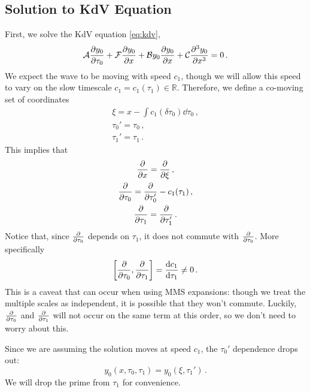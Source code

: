 \documentclass{jfm}
\let\Oldsubsection\subsection
\renewcommand{\subsection}{\FloatBarrier\Oldsubsection}
\begin{document}
\subsection{\label{sec:kdv_solution} Solution to KdV Equation}
First, we solve the KdV equation \cref{eq:kdv},
\begin{equation}
  \mathcal{A} \pdv{y_0}{\tau_0} + \mathcal{F} \pdv{y_0}{x} + \mathcal{B}
  y_0 \pdv{y_0}{x} + \mathcal{C} \pdv[3]{y_0}{x} = 0  \,.
\end{equation}
We expect the wave to be moving with speed $c_1$, though we will allow
this speed to vary on the slow timescale $c_1 = c_1(\tau_1) \in
\mathbb{R}$.
Therefore, we define a co-moving set of coordinates
\begin{gather}
  \xi = x - \int c_1(\delta \tau_0) \dd{\tau_0} \,, \\
  \tau_0' = \tau_0 \,, \\
  \tau_1' = \tau_1 \,.
\end{gather}
This implies that
\begin{gather}
  \pdv{x} = \pdv{\xi} \,, \\
  \pdv{\tau_0} = \pdv{\tau_0'} - c_1(\tau_1) \,, \\
  \pdv{\tau_1} = \pdv{\tau_1'} \,.
\end{gather}
Notice that, since $\pdv{\tau_0}$ depends on $\tau_1$, it does not
commute with $\pdv{\tau_0}$.
More specifically
\begin{equation}
  \bqty{\pdv{\tau_0}, \pdv{\tau_1} } = \dv{c_1}{\tau_1} \neq 0 \,.
\end{equation}
This is a caveat that can occur when using MMS expansions: though we
treat the multiple scales as independent, it is possible that they won't
commute.
Luckily, $\pdv{\tau_0}$ and $\pdv{\tau_1}$ will not occur on the same
term at this order, so we don't need to worry about this.

Since we are assuming the solution moves at speed $c_1$, the $\tau_0'$
dependence drops out:
\begin{equation}
  y_0(x,\tau_0,\tau_1) = y_0(\xi, \tau_1') \,.
\end{equation}
We will drop the prime from $\tau_1$ for convenience.
\end{document}
